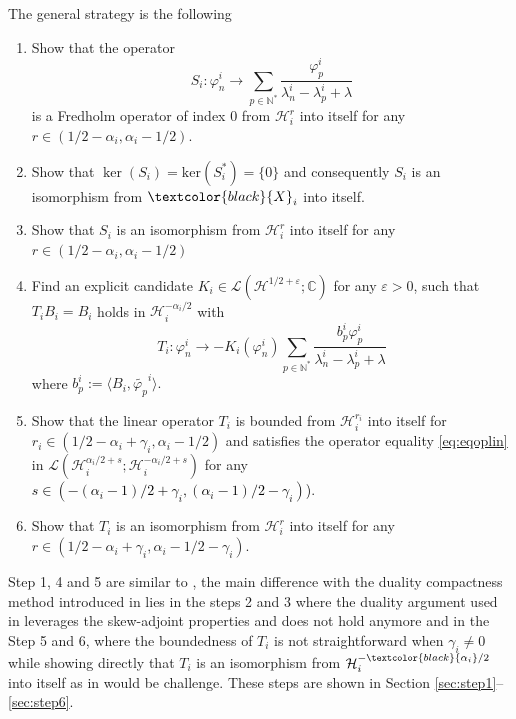 \documentclass[11pt, dvipsnames]{amsart}
\begin{document}
The general strategy 
is the following
\begin{enumerate}
    \item Show that the operator 
    \begin{equation}
        \label{eq:defS}
        S_{i}:\varphi_{n}^{i} \rightarrow \sum\limits_{p\in\mathbb{N}^{*}}\frac{\varphi_{p}^{i}}{\lambda_{n}^{i}-\lambda_{p}^{i}+\lambda}
    \end{equation}
    is a Fredholm operator of index $0$ from $\mathcal{H}^{r}_{i}$ into itself for any $r\in (1/2-\alpha_{i}, \alpha_{i}-1/2)$.
    \item Show that $\ker(S_{i}) = \text{ker}(S^{*}_{i})=\{0\}$ and consequently $S_{i}$ is an isomorphism from $\textcolor{black}{X}_{i}$ into itself.
    \item Show that $S_{i}$ is an isomorphism from $\mathcal{H}_{i}^{r}$ into itself for any $r\in (1/2-\alpha_{i}, \alpha_{i}-1/2)$\\
    \item Find an explicit candidate $K_{i}\in \mathcal{L}(\mathcal{H}^{1/2+\varepsilon};\mathbb{C})$ for any $\varepsilon>0$, such that $T_{i}B_{i}= B_{i}$ holds in $\mathcal{H}_{i}^{-\alpha_{i}/2}$ with
        \begin{equation}
        \label{eq:defT}
        T_{i}:\varphi_{n}^{i} \rightarrow -K_{i}(\varphi_{n}^{i})\sum\limits_{p\in\mathbb{N}^{*}}\frac{b_p^i\varphi_{p}^{i}}{\lambda_{n}^{i}-\lambda_{p}^{i}+\lambda}
    \end{equation} where $b_p^i:=\langle B_{i},\widetilde{\varphi_p}^{i}\rangle.$
    
    \item Show that the linear operator $T_{i}$ is bounded from $\mathcal{H}_{i}^{r_{i}}$ into itself for $r_{i}\in(1/2-\alpha_{i}+\gamma_{i}, \alpha_{i}-1/2)$ and satisfies the operator equality \eqref{eq:eqoplin} in $\mathcal{L}(\mathcal{H}_{i}^{\alpha_{i}/2+s};\mathcal{H}_{i}^{-\alpha_{i}/2+s})$ for any 
    \textcolor{black}{$s\in(-(\alpha_{i}-1)/2+\gamma_{i},(\alpha_{i}-1)/2-\gamma_{i})$)}.
    \item Show that $T_{i}$ is an isomorphism from
    $\mathcal{H}^{r}_{i}$ into itself for any $r\in(1/2-\alpha_{i}+\gamma_{i}, \alpha_{i}-1/2-\gamma_{i})$.
    
\end{enumerate}
Step 1, 4 and 5 are similar to \cite{Gagnon2022-fredholm}, the main difference with the duality compactness method introduced in \cite{Gagnon2022-fredholm} lies in the steps 2 and 3 where the duality argument used in \cite{Gagnon2022-fredholm} leverages the skew-adjoint properties and does not hold anymore and in the Step 5 and 6, where the boundedness of $T_{i}$ is not straightforward when $\gamma_{i}\neq 0$ while showing directly that $T_{i}$ is an isomorphism from $\mathcal{H}_{i}^{-\textcolor{black}{\alpha_{i}}/2}$ into itself as in \cite{Gagnon2022-fredholm} would be challenge. 
These steps are shown in Section \ref{sec:step1}--\ref{sec:step6}. 
\end{document}
